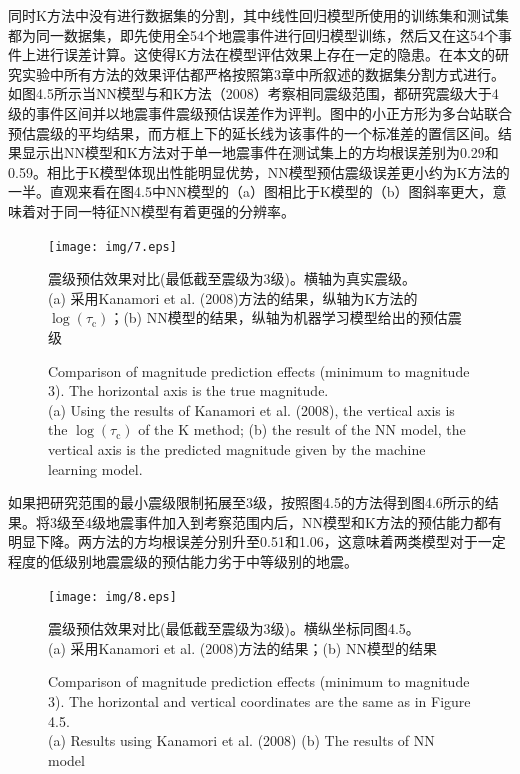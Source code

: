 \indent 同时K方法中没有进行数据集的分割，其中线性回归模型所使用的训练集和测试集都为同一数据集，即先使用全54个地震事件进行回归模型训练，然后又在这54个事件上进行误差计算。这使得K方法在模型评估效果上存在一定的隐患。在本文的研究实验中所有方法的效果评估都严格按照第3章中所叙述的数据集分割方式进行。\\
\indent 如图4.5所示当NN模型与和K方法（2008）考察相同震级范围，都研究震级大于4级的事件区间并以地震事件震级预估误差作为评判。图中的小正方形为多台站联合预估震级的平均结果，而方框上下的延长线为该事件的一个标准差的置信区间。结果显示出NN模型和K方法对于单一地震事件在测试集上的方均根误差别为0.29和0.59。相比于K模型体现出性能明显优势，NN模型预估震级误差更小约为K方法的一半。直观来看在图4.5中NN模型的（a）图相比于K模型的（b）图斜率更大，意味着对于同一特征NN模型有着更强的分辨率。\\
\begin{figure}[!h] 
\centering 
\texttt{[image: img/7.eps]} 
\renewcommand{\figurename}{图} 
\caption{震级预估效果对比(最低截至震级为3级)。横轴为真实震级。\\
(a) 采用Kanamori et al. (2008)方法的结果，纵轴为K方法的$\log \left(\tau_{\mathrm{c}}\right)$；(b) NN模型的结果，纵轴为机器学习模型给出的预估震级} 
\addtocounter{figure}{-1} \vspace{-5pt} 
\renewcommand{\figurename}{Fig} 
\caption{Comparison of magnitude prediction effects (minimum to magnitude 3). The horizontal axis is the true magnitude.\\
(a) Using the results of Kanamori et al. (2008), the vertical axis is the $\log \left(\tau_{\mathrm{c}}\right)$ of the K method; (b) the result of the NN model, the vertical axis is the predicted magnitude given by the machine learning model.} 
\renewcommand{\figurename}{图} 
\label{fig:network-device-influence.png} 
\end{figure}
\indent 如果把研究范围的最小震级限制拓展至3级，按照图4.5的方法得到图4.6所示的结果。将3级至4级地震事件加入到考察范围内后，NN模型和K方法的预估能力都有明显下降。两方法的方均根误差分别升至0.51和1.06，这意味着两类模型对于一定程度的低级别地震震级的预估能力劣于中等级别的地震。\\
\begin{figure}[!h] 
\centering 
\texttt{[image: img/8.eps]} 
\renewcommand{\figurename}{图} 
\caption{震级预估效果对比(最低截至震级为3级)。横纵坐标同图4.5。\\
(a) 采用Kanamori et al. (2008)方法的结果；(b) NN模型的结果} 
\addtocounter{figure}{-1} \vspace{-5pt} 
\renewcommand{\figurename}{Fig} 
\caption{Comparison of magnitude prediction effects (minimum to magnitude 3). The horizontal and vertical coordinates are the same as in Figure 4.5. \\
(a) Results using Kanamori et al. (2008) (b) The results of NN model} 
\renewcommand{\figurename}{图} 
\label{fig:network-device-influence.png} 
\end{figure}

